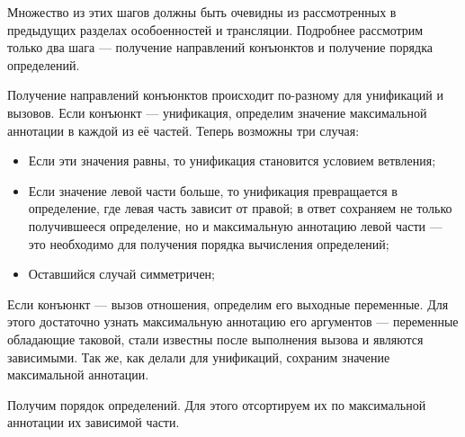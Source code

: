 Множество из этих шагов должны быть очевидны из рассмотренных в предыдущих разделах особоенностей \miniKanren{} и трансляции.
Подробнее рассмотрим только два шага --- получение направлений конъюнктов и получение порядка определений.

Получение направлений конъюнктов происходит по-разному для унификаций и вызовов.
Если конъюнкт --- унификация, определим значение максимальной аннотации в каждой из её частей.
Теперь возможны три случая:
\begin{itemize}
    \item Если эти значения равны, то унификация становится условием ветвления;
    \item Если значение левой части больше, то унификация превращается в определение, где левая часть зависит от правой; в ответ сохраняем не только получившееся определение, но и максимальную аннотацию левой части --- это необходимо для получения порядка вычисления определений;
    \item Оставшийся случай симметричен;
\end{itemize}

Если конъюнкт --- вызов отношения, определим его выходные переменные.
Для этого достаточно узнать максимальную аннотацию его аргументов --- переменные обладающие таковой, стали известны после выполнения вызова и являются зависимыми.
Так же, как делали для унификаций, сохраним значение максимальной аннотации.

Получим порядок определений.
Для этого отсортируем их по максимальной аннотации их зависимой части.
